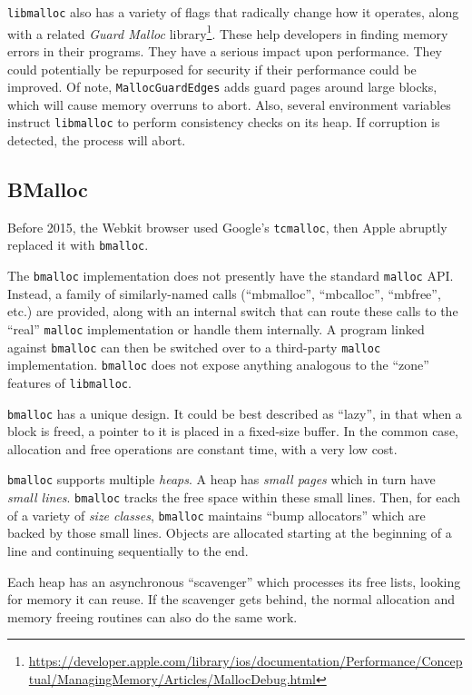 \texttt{libmalloc} also has a variety of flags that radically change how it
operates, along with a related {\em Guard Malloc}
library\footnote{\url{https://developer.apple.com/library/ios/documentation/Performance/Conceptual/ManagingMemory/Articles/MallocDebug.html}}. These help developers in
finding memory errors in their programs. They have a serious
impact upon performance. They could potentially be
repurposed for security if their performance could be
improved.
Of note, \texttt{MallocGuardEdges} adds guard pages around large blocks, which will
cause memory overruns to abort. Also, several
environment variables instruct \texttt{libmalloc} to perform consistency
checks on its heap. If corruption is detected, the process will abort.

\subsection{BMalloc}
Before 2015, the Webkit browser used Google's \texttt{tcmalloc}, then
Apple abruptly replaced it with \texttt{bmalloc}. 

The \texttt{bmalloc} implementation does not
presently have the standard \texttt{malloc} API. Instead, a family of
similarly-named calls (``mbmalloc'', ``mbcalloc'', ``mbfree'', etc.)
are provided, along with an internal switch that can route these calls
to the ``real'' \texttt{malloc} implementation or handle them
internally. A program linked against \texttt{bmalloc} can then
be switched over to a third-party \texttt{malloc} implementation.
\texttt{bmalloc} does not expose anything
analogous to the ``zone'' features of \texttt{libmalloc}.

\texttt{bmalloc} has a unique design. It could be best described as ``lazy'', in that
when a block is freed, a pointer to it is placed in a fixed-size
buffer. In the common case, allocation and free operations are
constant time, with a very low cost.

\texttt{bmalloc} supports multiple {\em heaps}. A heap has {\em small
  pages} which in turn have {\em small lines}.
\texttt{bmalloc} tracks the free space within these small  lines.
Then, for each of a
variety of {\em size classes}, \texttt{bmalloc} maintains ``bump
allocators'' which are backed by those small lines. Objects are
allocated starting at the beginning of a line and continuing
sequentially to the end. 

Each heap has an asynchronous ``scavenger'' which processes its free lists,
looking for memory it can reuse. If the scavenger gets behind, the
normal allocation and memory freeing routines can also do the same
work.

